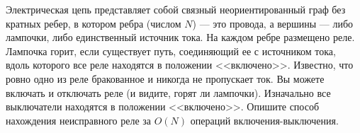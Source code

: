 \documentclass{article}
\begin{document}
Электрическая цепь представляет собой связный неориентированный граф без кратных ребер,
 в котором ребра (числом $N$) --- это провода, а вершины --- либо лампочки, либо единственный источник тока. 
На каждом ребре размещено реле. Лампочка горит, если существует путь, соединяющий ее с источником тока, вдоль которого все реле находятся в положении <<включено>>.
 Известно, что ровно одно из реле бракованное и никогда не пропускает ток. Вы можете включать и отключать реле (и видите, горят ли лампочки). 
Изначально все выключатели находятся в положении <<включено>>. Опишите способ нахождения неисправного реле за $O(N)$ операций включения-выключения.
\end{document}
